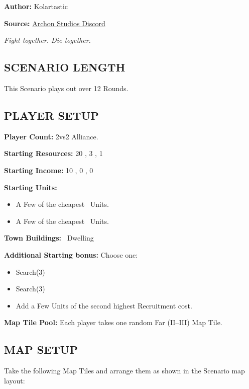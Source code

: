 
\begin{multicols*}{2}

\textbf{Author:} Kolartastic

\textbf{Source:} \href{https://discord.com/channels/740870068178649108/1161571991732625468/threads/1164804609605390386}{Archon Studios Discord}

\textit{Fight together. Die together.}  %

\subsection*{\MakeUppercase{Scenario Length}}
This Scenario plays out over 12 Rounds.

\subsection*{\MakeUppercase{Player Setup}}
\textbf{Player Count:} 2vs2 Alliance.

\textbf{Starting Resources:} 20 , 3 , 1 

\textbf{Starting Income:} 10 , 0 , 0 

\textbf{Starting Units:}

\begin{itemize}
  \item A Few of the cheapest \bronze\ Units.
  \item A Few of the cheapest \silver\ Units.
\end{itemize}

\textbf{Town Buildings:} \bronze\ Dwelling

\textbf{Additional Starting bonus:}
Choose one:
\begin{itemize}
  \item Search(3) 
  \item Search(3) 
  \item Add a Few \bronze Units of the second highest Recruitment cost.
\end{itemize}

\textbf{Map Tile Pool:} Each player takes one random Far (II–III) Map Tile.

\subsection*{\MakeUppercase{Map Setup}}
Take the following Map Tiles and arrange them as shown in the Scenario map layout:


\end{multicols*}
